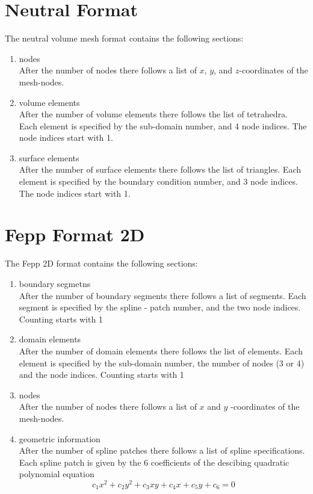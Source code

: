 \documentclass[12pt]{book}
\begin{document}
\section{Neutral Format}
The neutral volume mesh format contains the following sections:

\begin{enumerate}
\item
nodes \\
After the number of nodes there follows a list of $x$, $y$, 
and $z$-coordinates of the mesh-nodes.
\item
volume elements \\
After the number of volume elements there follows the list of tetrahedra.
Each element is specified by the sub-domain number, and 4 node indices. The
node indices start with 1.
\item
surface elements \\ 
After the number of surface elements there follows
the list of triangles.  Each element is specified by the boundary
condition number, and 3 node indices. The node indices start with 1.
\end{enumerate}



\section{Fepp Format 2D}
The Fepp 2D format contains the following sections:

\begin{enumerate}
\item
boundary segmetns \\
After the number of boundary segments there follows a list of 
segments. Each segment is specified by the spline - patch number,
and the two node indices. Counting starts with 1
\item
domain elements \\
After the number of domain elements there follows the list of elements.
Each element is specified by the sub-domain number, the number of nodes (3 or 4) and the node indices. Counting starts with 1
\item
nodes \\
After the number of nodes there follows a list of $x$ and $y$ 
-coordinates of the mesh-nodes.
\item
geometric information \\
After the number of spline patches there follows a list of spline specifications. Each spline patch is given by the 6 coefficients of the descibing 
quadratic polynomial equation
$$
c_1 x^2 + c_2 y^2 + c_3 xy + c_4 x + c_5 y + c_6 = 0
$$
\end{enumerate}
\end{document}
